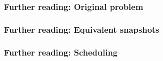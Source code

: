 \documentclass{beamer}
\begin{document}
  {\list{}
     {%
      \setlength{\leftmargin}{\labelwidth}%
      \setlength{\labelsep}{\biblabelsep}%
      \addtolength{\leftmargin}{\labelsep}%
      \setlength{\itemsep}{\bibitemsep}%
      \setlength{\parsep}{\bibparsep}}}
  {\endlist}
  {\item}

\begin{frame}[allowframebreaks]
  \frametitle{Further reading: Original problem}
  \nocite{*}
  \printbibliography[keyword=chandy]
\end{frame}

\begin{frame}
  \frametitle{Further reading: Equivalent snapshots}
  \nocite{*}
  \printbibliography[keyword=equivalent]
\end{frame}

\begin{frame}[allowframebreaks]
  \frametitle{Further reading: Scheduling}
  \nocite{*}
  \printbibliography[keyword=sched]
\end{frame}
\end{document}

